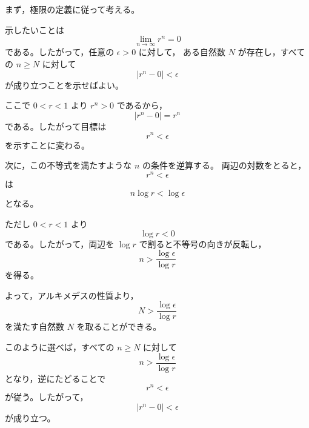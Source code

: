 \begin{strategy}
	まず，極限の定義に従って考える。

	示したいことは
	\[
		\lim_{n\to\infty}r^n=0
	\]
	である。したがって，任意の $\epsilon>0$ に対して，
	ある自然数 $N$ が存在し，すべての $n\geq N$ に対して
	\[
		|r^n-0|<\epsilon
	\]
	が成り立つことを示せばよい。

	ここで $0<r<1$ より $r^n>0$ であるから，
	\[
		|r^n-0|=r^n
	\]
	である。したがって目標は
	\[
		r^n<\epsilon
	\]
	を示すことに変わる。

	次に，この不等式を満たすような $n$ の条件を逆算する。
	両辺の対数をとると，
	\[
		r^n<\epsilon
	\]
	は
	\[
		n\log r<\log\epsilon
	\]
	となる。

	ただし $0<r<1$ より
	\[
		\log r<0
	\]
	である。したがって，両辺を $\log r$ で割ると不等号の向きが反転し，
	\[
		n>\frac{\log\epsilon}{\log r}
	\]
	を得る。

	よって，アルキメデスの性質より，
	\[
		N>\frac{\log\epsilon}{\log r}
	\]
	を満たす自然数 $N$ を取ることができる。

	このように選べば，すべての $n\geq N$ に対して
	\[
		n>\frac{\log\epsilon}{\log r}
	\]
	となり，逆にたどることで
	\[
		r^n<\epsilon
	\]
	が従う。したがって，
	\[
		|r^n-0|<\epsilon
	\]
	が成り立つ。
\end{strategy}
